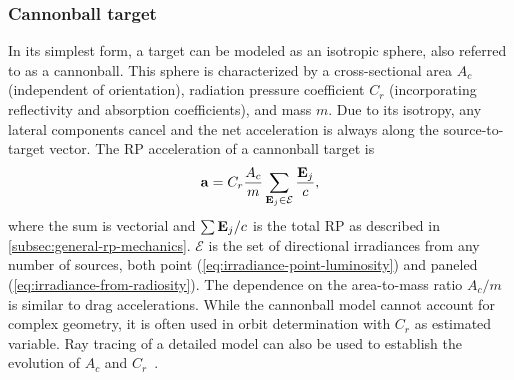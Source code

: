 \subsubsection{Cannonball target}
In its simplest form, a target can be modeled as an isotropic sphere, also referred to as a cannonball. This sphere is characterized by a cross-sectional area $A_c$ (independent of orientation), radiation pressure coefficient $C_r$ (incorporating reflectivity and absorption coefficients), and mass $m$. Due to its isotropy, any lateral components cancel and the net acceleration is always along the source-to-target vector. The \gls{RP} acceleration of a cannonball target is~\cite{Montenbruck2000}
\begin{align}
    \label{eq:cannonball-target}
    \vb a = C_r \frac{A_c}{m}\sum_{\vb E_j \in \mathcal{E}}\frac{\vb E_j}{c},
\end{align}
where the sum is vectorial and $\sum\vb E_j/c$ is the total \gls{RP} as described in \cref{subsec:general-rp-mechanics}. $\mathcal{E}$ is the set of directional irradiances from any number of sources, both point (\cref{eq:irradiance-point-luminosity}) and paneled (\cref{eq:irradiance-from-radiosity}). The dependence on the area-to-mass ratio $A_c/m$ is similar to drag accelerations. While the cannonball model cannot account for complex geometry, it is often used in orbit determination with $C_r$ as estimated variable. Ray tracing of a detailed model can also be used to establish the evolution of $A_c$ and $C_r$~\cite{Hattori2019}.


